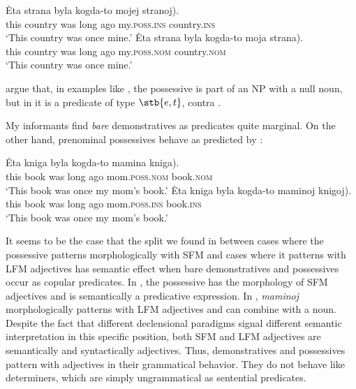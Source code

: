 \documentclass[output=paper,
colorlinks,
citecolor=brown,
newtxmath
]{langscibook}
\begin{document}

\ea
    \ea \gll Ėta strana byla kogda-to mojej \minsp{(} stranoj).\label{stranoj}\\
    this country was {long ago} my.\textsc{poss.ins} {} country.\textsc{ins}\\
    \glt `This country was once mine.'
    \ex \gll Ėta strana byla kogda-to moja \minsp{(*} strana).\label{mojastrana}\\
    this country was {long ago} my.\textsc{poss.nom} {} country.\textsc{nom}\\
    \glt `This country was once mine.'
\z\z


\noindent \citeauthor{Partee.Borschev2003} argue that, in examples like , the possessive is part of an NP with a null noun, but in  it is a predicate of type $\stb{e,t}$, contra \citet{Pereltsvaig2007}.

My informants find \textit{bare} demonstratives as predicates quite marginal. On the other hand, prenominal possessives behave as predicted by \citet{Partee.Borschev2003}:


\ea
    \ea \gll Ėta kniga byla kogda-to mamina \minsp{(*} kniga).\label{maminakniga}\\
    this book was {long ago} mom.\textsc{poss.nom} {} book.\textsc{nom}\\
    \glt `This book was once my mom's book.'
    \ex \gll Ėta kniga byla kogda-to maminoj \minsp{(} knigoj).\label{maminojknigoj}\\
    this book was {long ago} mom.\textsc{poss.ins} {} book.\textsc{ins}\\
    \glt `This book was once my mom's book.'
\z\z

\noindent It seems to be the case that the split we found in  between cases where the possessive patterns morphologically with SFM and cases where it patterns with LFM adjectives has semantic effect when bare demonstratives and possessives occur as copular predicates. In , the possessive has the morphology of SFM adjectives and is semantically a predicative expression. In , \textit{maminoj} morphologically patterns with LFM adjectives and can combine with a noun. Despite the fact that different declensional paradigms signal different semantic interpretation in this specific position, both SFM and LFM adjectives are semantically and syntactically adjectives. Thus, demonstratives and possessives pattern with adjectives in their grammatical behavior. They do not behave like determiners, which are simply ungrammatical as sentential predicates. 
\end{document}
